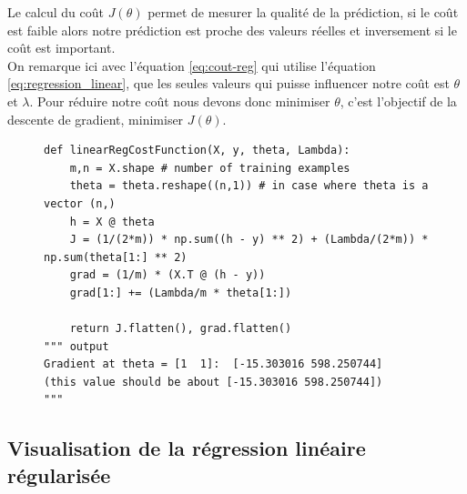 \vspace{0.5cm}


Le calcul du coût $J(\theta)$ permet de mesurer la qualité de la prédiction, si le coût est faible alors notre prédiction est proche des valeurs réelles et inversement si le coût est important. \\
On remarque ici avec l'équation \ref{eq:cout-reg} qui utilise l'équation \ref{eq:regression_linear}, que les seules valeurs qui puisse influencer notre coût est $\theta$ et $\lambda$. Pour réduire notre coût nous devons donc minimiser $\theta$, c'est l'objectif
de la descente de gradient, minimiser $J(\theta)$.

\vspace{0.2cm}

\begin{figure}[!h]
\begin{verbatim}
def linearRegCostFunction(X, y, theta, Lambda):
    m,n = X.shape # number of training examples
    theta = theta.reshape((n,1)) # in case where theta is a vector (n,) 
    h = X @ theta
    J = (1/(2*m)) * np.sum((h - y) ** 2) + (Lambda/(2*m)) * np.sum(theta[1:] ** 2)
    grad = (1/m) * (X.T @ (h - y))
    grad[1:] += (Lambda/m * theta[1:])

    return J.flatten(), grad.flatten()
""" output
Gradient at theta = [1  1]:  [-15.303016 598.250744] 
(this value should be about [-15.303016 598.250744])
"""
\end{verbatim}   
\end{figure}


\subsection{Visualisation de la régression linéaire régularisée}

